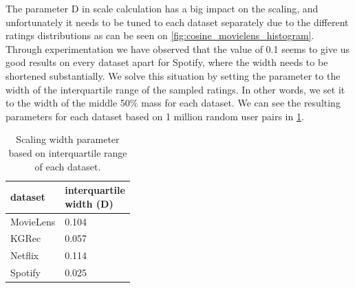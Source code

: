 The parameter D in scale calculation has a big impact on the scaling, and unfortunately it needs to be tuned to each dataset separately due to the different ratings distributions as can be seen on \ref{fig:cosine_movielens_histogram}. Through experimentation we have observed that the value of 0.1 seems to give us good results on every dataset apart for Spotify, where the width needs to be shortened substantially. We solve this situation by setting the parameter to the width of the interquartile range of the sampled ratings. In other words, we set it to the width of the middle 50\% mass for each dataset. We can see the resulting parameters for each dataset based on 1 million random user pairs in \ref{table:5.3_interquartile_width}. 

\begin{table}[!ht]
    \centering
    \begin{tabular}{ l l}
        dataset & \makecell[l]{interquartile \\ width (D)} \\
        \hline
        MovieLens & 0.104 \\
        KGRec & 0.057 \\
        Netflix & 0.114 \\
        Spotify & 0.025
            
    \end{tabular}
    \caption{Scaling width parameter based on interquartile range of each dataset.}
    \label{table:5.3_interquartile_width}
\end{table}



